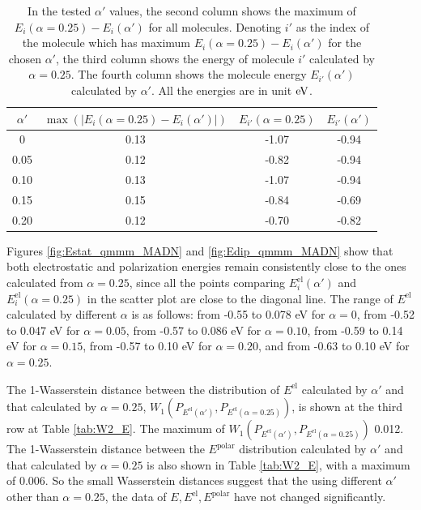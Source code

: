 \documentclass[%
 reprint,
superscriptaddress,
 amsmath,amssymb,
 aps,
prb,
floatfix
]{revtex4-2}
\begin{document}
\begin{table}[tbp]
\caption{\label{tab:maxEi}%
In the tested $\alpha'$ values, the second column shows the maximum of $E_i(\alpha=0.25) - E_i(\alpha')$ for all molecules. Denoting $i'$ as the index of the molecule which has maximum $E_i(\alpha=0.25) - E_i(\alpha')$ for the chosen $\alpha'$, the third column shows the energy of molecule $i'$ calculated by $\alpha=0.25$. The fourth column shows the molecule energy $E_{i'}(\alpha')$ calculated by $\alpha'$. All the energies are in unit $\unit[]{eV}$.
}
\begin{ruledtabular}
  \begin{tabular}{c c c c}
  $\alpha'$ & $\max(|E_i(\alpha=0.25) - E_i(\alpha')|)$  & $E_{i'}(\alpha=0.25)$ & $E_{i'}(\alpha')$ \\
    \hline
  0 & 0.13 &  -1.07 & -0.94 \\
  0.05 & 0.12 & -0.82 & -0.94 \\
  0.10 & 0.13 & -1.07 & -0.94 \\
  0.15 & 0.15 & -0.84 & -0.69 \\
  0.20 & 0.12 & -0.70 & -0.82 \\
    \end{tabular}
\end{ruledtabular}
\end{table}

Figures \ref{fig:Estat_qmmm_MADN} and \ref{fig:Edip_qmmm_MADN} show that both electrostatic and polarization energies remain consistently close to the ones calculated from $\alpha=0.25$, since all the points comparing $E^\text{el}_i(\alpha')$ and $E^\text{el}_i(\alpha=0.25)$ in the scatter plot are close to the diagonal line.
The range of $E^\text{el}$ calculated by different $\alpha$ is as follows:
from  -0.55 to 0.078 eV for $\alpha=0$, 
from  -0.52 to 0.047 eV for $\alpha=0.05$, 
from  -0.57 to 0.086 eV for $\alpha=0.10$, 
from  -0.59 to 0.14 eV for $\alpha=0.15$, 
from  -0.57 to 0.10 eV for $\alpha=0.20$, 
and from -0.63 to 0.10 eV for $\alpha=0.25$.


The 1-Wasserstein distance between the distribution of $E^\text{el}$ calculated by $\alpha'$ and that calculated by $\alpha=0.25$, $W_1(P_{E^\text{el}(\alpha')}, P_{E^\text{el}(\alpha=0.25)})$, is shown at the third row at Table \ref{tab:W2_E}. 
The maximum of $W_1(P_{E^\text{el}(\alpha')}, P_{E^\text{el}(\alpha=0.25)})$ 0.012. The 1-Wasserstein distance between the $E^\text{polar}$ distribution calculated by $\alpha'$ and that calculated by $\alpha=0.25$ is also shown in Table \ref{tab:W2_E}, with a maximum of 0.006. So the small Wasserstein distances suggest that the using different $\alpha'$ other than $\alpha=0.25$, the data of $E, E^\text{el}, E^\text{polar}$ have not changed significantly.
\end{document}
